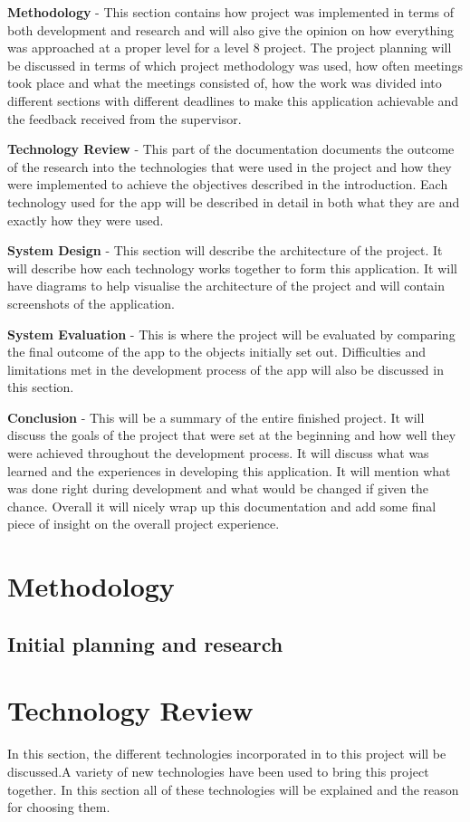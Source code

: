 \textbf {Methodology} - This section contains how project was implemented in terms of both development and research and will also give the opinion on how everything was approached at a proper level for a level 8 project. The project planning will be discussed in terms of which project methodology was used, how often meetings took place and what the meetings consisted of, how the work was divided into different sections with different deadlines to make this application achievable and the feedback received from the supervisor.


\textbf {Technology Review} - This part of the documentation documents the outcome of the research into the technologies that were used in the project and how they were implemented to achieve the objectives described in the introduction. Each technology used for the app will be described in detail in both what they are and exactly how they were used.

\textbf {System Design} - This section will describe the architecture of the project. It will describe how each technology works together to form this application. It will have diagrams to help visualise the architecture of the project and will contain screenshots of the application.

\textbf {System Evaluation} - This is where the project will be evaluated by comparing the final outcome of the app to the objects initially set out. Difficulties and limitations met in the development process of the app will also be discussed in this section.

\textbf {Conclusion} - This will be a summary of the entire finished project. It will discuss the goals of the project that were set at the beginning and how well they were achieved throughout the development process. It will discuss what was learned and the experiences in developing this application. It will mention what was done right during development and what would be changed if given the chance. Overall it will nicely wrap up this documentation and add some final piece of insight on the overall project experience.

\chapter{Methodology}
\section{Initial planning and research}

\chapter{Technology Review}
In this section, the different technologies incorporated in to this project will be discussed.A variety of new technologies have been used to bring this project together. In this section all of these technologies will be explained and the reason for choosing them.

